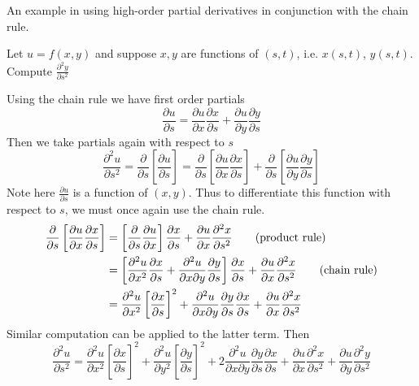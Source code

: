 \documentclass[11pt]{article}
\begin{document}
\begin{center}
  An example in using high-order partial derivatives in conjunction with the chain rule.
\end{center}
Let $u=f(x,y)$ and suppose $x,y$ are functions of $(s,t)$, i.e. $x(s,t)$, $y(s,t)$. Compute $\frac{\partial^2 y}{\partial s^2}$
\begin{solution}
  $ $\\
  Using the chain rule we have first order partials
  \[
    \frac{\partial u}{\partial s} = \frac{\partial u}{\partial x}\frac{\partial x}{\partial s} + \frac{\partial u}{\partial y}\frac{\partial y}{\partial s}
  \]
  Then we take partials again with respect to $s$
  \[
    \frac{\partial^2 u}{\partial s^2} = \frac{\partial}{\partial s}\left[\frac{\partial u}{\partial s}\right] = \frac{\partial}{\partial s} \left[\frac{\partial u}{\partial x}\frac{\partial x}{\partial s}\right] + \frac{\partial}{\partial s} \left[\frac{\partial u}{\partial y}\frac{\partial y}{\partial s}\right]
  \]
  Note here $\frac{\partial u}{\partial s}$ is a function of $(x,y)$. Thus to differentiate this function with respect to $s$, we must once again use the chain rule.
  \begin{align*}
    \frac{\partial}{\partial s}\left[ \frac{\partial u}{\partial x}\frac{\partial x}{\partial s}\right] &= \left[ \frac{\partial}{\partial s}\frac{\partial u}{\partial x}\right]\frac{\partial x}{\partial s} + \frac{\partial u}{\partial x}\frac{\partial^2 x}{\partial s^2} \tag{\text{product rule}}\\
    &= \left[ \frac{\partial^2 u}{\partial x^2} \frac{\partial x}{\partial s} + \frac{\partial^2 u}{\partial x \partial y}\frac{\partial y}{\partial s} \right] \frac{\partial x}{\partial s} + \frac{\partial u}{\partial x}\frac{\partial^2 x}{\partial s^2} \tag{\text{chain rule}}\\
    &= \frac{\partial^2 u}{\partial x^2} \left[ \frac{\partial x}{\partial s} \right]^2 + \frac{\partial^2 u}{\partial x \partial y}\frac{\partial y}{\partial s}\frac{\partial x}{\partial s} + \frac{\partial u}{\partial x}\frac{\partial^2 x}{\partial s^2}\\
  \end{align*}
  Similar computation can be applied to the latter term. Then
  \[
    \frac{\partial^2 u}{\partial s^2} =  \frac{\partial^2 u}{\partial x^2} \left[ \frac{\partial x}{\partial s} \right]^2 + \frac{\partial^2 u}{\partial y^2} \left[ \frac{\partial y}{\partial s} \right]^2 + 2 \frac{\partial^2 u}{\partial x \partial y} \frac{\partial y}{\partial s}\frac{\partial x}{\partial s} + \frac{\partial u}{\partial x}\frac{\partial^2 x}{\partial s^2} + \frac{\partial u}{\partial y}\frac{\partial^2 y}{\partial s^2}
  \]
\end{solution}
\end{document}
